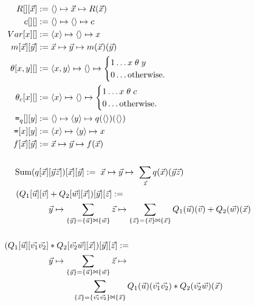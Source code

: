 \begin{align*}
R[][\vec{x}]          := & \; {\langle\rangle} \mapsto \vec{x} \mapsto R(\vec{x})\\
c[][]                 := & \; {\langle\rangle} \mapsto {\langle\rangle} \mapsto c\\
Var[x][]              := & \; {\langle x\rangle} \mapsto {\langle\rangle} \mapsto x\\
m[\vec{x}][\vec{y}]   := & \; \vec{x} \mapsto \vec{y} \mapsto
m(\vec{x})(\vec{y})
\\
\theta[x,y][]         := & \; {\langle x,y\rangle} \mapsto {\langle\rangle} \mapsto
                           \begin{cases}
                           1 \ldots x \; \theta \; y \\
                           0 \ldots \mbox{otherwise.}
                           \end{cases}\\
\theta_c[x][]         := & \; {\langle x\rangle} \mapsto {\langle\rangle} \mapsto
                           \begin{cases}
                           1 \ldots x \; \theta \; c \\
                           0 \ldots \mbox{otherwise.}
                           \end{cases}\\
\mbox{{\tt =}}_q[][y]       := & \; {\langle\rangle} \mapsto {\langle y\rangle} \mapsto
                              q({\langle\rangle})({\langle\rangle})
\\
\mbox{{\tt =}}[x][y]         := & \; {\langle x\rangle} \mapsto {\langle y\rangle} \mapsto x
\\
f[\vec{x}][\vec{y}]   := & \; \vec{x} \mapsto \vec{y} \mapsto f(\vec{x})
\\ 
\\
\mbox{Sum}(q[\vec{x}] & [\vec{y}\vec{z}])[\vec{x}][\vec{y}] := \;
\vec{x} \mapsto \vec{y} \mapsto \ \sum_{\vec{z}} q(\vec{x})(\vec{y}\vec{z})
\\
(Q_1[\vec{u}][\vec{v}] & + Q_2[\vec{w}][\vec{x}])[\vec{y}][\vec{z}] :=  \\
& \vec{y} \mapsto \sum_{ \{\vec{y}\} = \{\vec{u}\} \Join \{\vec{w}\} }
\vec{z} \mapsto  \sum_{ \{\vec{z}\} = \{\vec{v}\} \Join \{\vec{x}\} }
Q_1(\vec{u})(\vec{v}) + Q_2(\vec{w})(\vec{x})
\\
\\
(Q_1[\vec{u}][\vec{v_1}\vec{v_2}] & * Q_2[\vec{v_2}\vec{w}][\vec{x}])
[\vec{y}][\vec{z}] :=  \\
& \vec{y} \mapsto \sum_{ \{\vec{y}\} = \{\vec{u}\} \Join \{\vec{w}\} }
\vec{z} \mapsto \\
& \qquad \;\;\;
\sum_{ \{\vec{z}\} = \{\vec{v_1}\vec{v_2}\} \Join \{\vec{x}\} }
Q_1(\vec{u})(\vec{v_1}\vec{v_2}) * Q_2(\vec{v_2}\vec{w})(\vec{x}) 
\end{align*}


